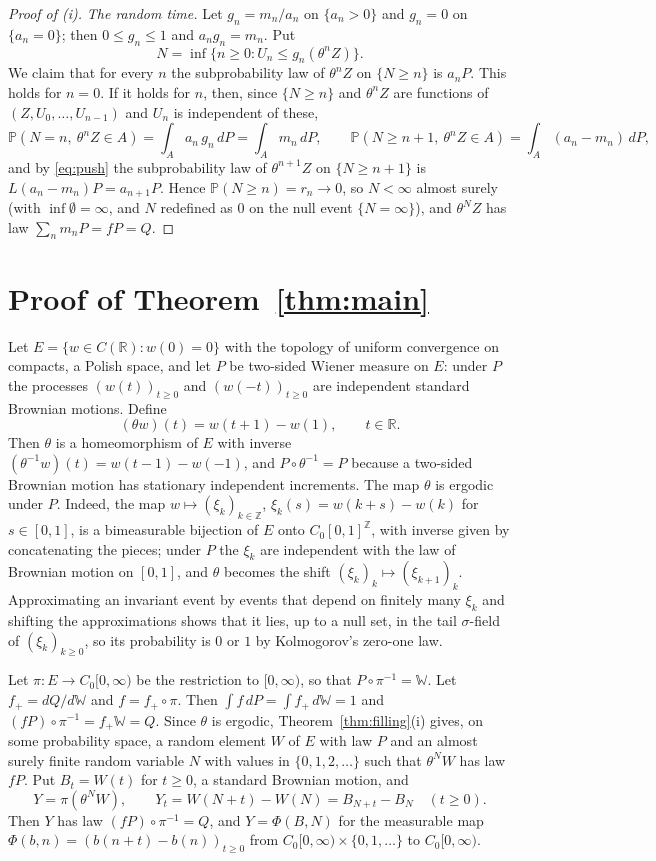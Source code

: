 \documentclass[11pt]{amsart}
\theoremstyle{remark}
\numberwithin{equation}{section}
\newcommand{\Pp}{\mathbb P}
\newcommand{\Z}{\mathbb Z}
\newcommand{\R}{\mathbb R}
\newcommand{\Wi}{\mathbb W}
\begin{document}
\begin{proof}[Proof of \textup{(i)}]
\emph{The random time.} Let $g_n=m_n/a_n$ on $\{a_n>0\}$ and $g_n=0$ on $\{a_n=0\}$; then $0\le g_n\le1$ and $a_ng_n=m_n$. Put
\[
N=\inf\{n\ge0:U_n\le g_n(\theta^nZ)\}.
\]
We claim that for every $n$ the subprobability law of $\theta^nZ$ on $\{N\ge n\}$ is $a_nP$. This holds for $n=0$. If it holds for $n$, then, since $\{N\ge n\}$ and $\theta^nZ$ are functions of $(Z,U_0,\dots,U_{n-1})$ and $U_n$ is independent of these,
\[
\Pp(N=n,\ \theta^nZ\in A)=\int_A a_n\,g_n\,dP=\int_A m_n\,dP,\qquad \Pp(N\ge n+1,\ \theta^nZ\in A)=\int_A(a_n-m_n)\,dP ,
\]
and by \eqref{eq:push} the subprobability law of $\theta^{n+1}Z$ on $\{N\ge n+1\}$ is $L(a_n-m_n)P=a_{n+1}P$. Hence $\Pp(N\ge n)=r_n\to0$, so $N<\infty$ almost surely (with $\inf\emptyset=\infty$, and $N$ redefined as $0$ on the null event $\{N=\infty\}$), and $\theta^NZ$ has law $\sum_nm_nP=fP=Q$.
\end{proof}

\section{Proof of Theorem~\ref{thm:main}}\label{sec:proof}

Let $E=\{w\in C(\R):w(0)=0\}$ with the topology of uniform convergence on compacts, a Polish space, and let $P$ be two-sided Wiener measure on $E$: under $P$ the processes $(w(t))_{t\ge0}$ and $(w(-t))_{t\ge0}$ are independent standard Brownian motions. Define
\[
(\theta w)(t)=w(t+1)-w(1),\qquad t\in\R .
\]
Then $\theta$ is a homeomorphism of $E$ with inverse $(\theta^{-1}w)(t)=w(t-1)-w(-1)$, and $P\circ\theta^{-1}=P$ because a two-sided Brownian motion has stationary independent increments. The map $\theta$ is ergodic under $P$. Indeed, the map $w\mapsto(\xi_k)_{k\in\Z}$, $\xi_k(s)=w(k+s)-w(k)$ for $s\in[0,1]$, is a bimeasurable bijection of $E$ onto $C_0[0,1]^{\Z}$, with inverse given by concatenating the pieces; under $P$ the $\xi_k$ are independent with the law of Brownian motion on $[0,1]$, and $\theta$ becomes the shift $(\xi_k)_k\mapsto(\xi_{k+1})_k$. Approximating an invariant event by events that depend on finitely many $\xi_k$ and shifting the approximations shows that it lies, up to a null set, in the tail $\sigma$-field of $(\xi_k)_{k\ge0}$, so its probability is $0$ or $1$ by Kolmogorov's zero-one law.

Let $\pi:E\to C_0[0,\infty)$ be the restriction to $[0,\infty)$, so that $P\circ\pi^{-1}=\Wi$. Let $f_+=dQ/d\Wi$ and $f=f_+\circ\pi$. Then $\int f\,dP=\int f_+\,d\Wi=1$ and $(fP)\circ\pi^{-1}=f_+\Wi=Q$. Since $\theta$ is ergodic, Theorem~\ref{thm:filling}(i) gives, on some probability space, a random element $W$ of $E$ with law $P$ and an almost surely finite random variable $N$ with values in $\{0,1,2,\dots\}$ such that $\theta^NW$ has law $fP$. Put $B_t=W(t)$ for $t\ge0$, a standard Brownian motion, and
\[
Y=\pi(\theta^NW),\qquad Y_t=W(N+t)-W(N)=B_{N+t}-B_N\quad(t\ge0).
\]
Then $Y$ has law $(fP)\circ\pi^{-1}=Q$, and $Y=\Phi(B,N)$ for the measurable map $\Phi(b,n)=(b(n+t)-b(n))_{t\ge0}$ from $C_0[0,\infty)\times\{0,1,\dots\}$ to $C_0[0,\infty)$.
\end{document}
